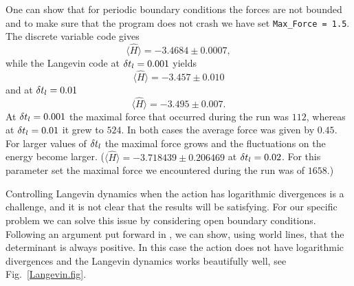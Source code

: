 One can show that for periodic boundary conditions the   forces are not bounded 
and to make sure that the program does not   crash we have  set \texttt{Max\_Force = 1.5}.\\
The discrete variable code gives
\begin{equation}
 \langle  \hat{H} \rangle  =  -3.4684 \pm 0.0007,
\end{equation} 
while the Langevin code at $ \delta t_{l} = 0.001$  yields 
\begin{equation}
 \langle  \hat{H} \rangle  =  -3.457 \pm 0.010 
\end{equation} 
and at $ \delta t_{l} = 0.01$
\begin{equation}
 \langle  \hat{H} \rangle  = -3.495 \pm 0.007\text{.}
\end{equation} 
 At $ \delta t_{l} = 0.001$   the maximal force that occurred during the run was 
$ 112$, whereas at $ \delta t_{l} = 0.01$ it grew to $524$.    In both cases the average force was given by $0.45$.   For larger values of  $ \delta t_{l} $ the maximal force grows and the fluctuations on the energy become  larger.  
($ \langle  \hat{H} \rangle  =  -3.718439    \pm   0.206469 $  at $ \delta t_{l} = 0.02$. For this parameter set  the maximal force we encountered during the run was of $1658$.)

Controlling Langevin dynamics when the action has logarithmic divergences is a challenge, and it is not clear  that the results will be satisfying.  For our specific problem we can solve this issue by considering open boundary conditions. Following an argument put forward in \cite{Assaad07}, we can show, using world lines, that the determinant is always positive.   In this case the  action does not  have logarithmic divergences and the Langevin dynamics works beautifully well, see Fig.~\ref{Langevin.fig}. 

